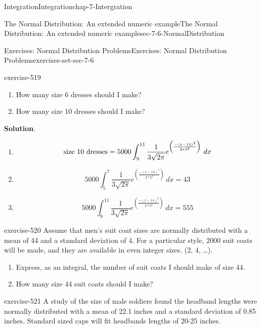 \documentclass[oneside,10pt,]{book}
\numberwithin{equation}{section}
\begin{document}
\begin{chapterptx}{Integration}{}{Integration}{}{}{chap-7-Intergration}
\begin{sectionptx}{The Normal Distribution: An extended numeric example}{}{The Normal Distribution: An extended numeric example}{}{}{sec-7-6-NormalDistribution}
\begin{exercises-subsection-numberless}{Exercises: Normal Distribution Problems}{}{Exercises: Normal Distribution Problems}{}{}{exercises-set-sec-7-6}
\begin{divisionexercise}{3}{}{}{exercise-519}
\begin{enumerate}[label=(\alph*)]
\item\hypertarget{li-781}{}\hypertarget{p-2976}{}%
How many size 6 dresses should I make?%
\item\hypertarget{li-782}{}\hypertarget{p-2977}{}%
How many size 10 dresses should I make?%
\end{enumerate}
\par\smallskip%
\noindent\textbf{Solution}.\hypertarget{solution-263}{}\quad%
\leavevmode%
\begin{enumerate}[label=(\alph*)]
\item\hypertarget{li-783}{}%
\begin{equation*}
\hbox{size 10 dresses}=5000\int_{9}^{11}
\frac{1}{3\sqrt{2\pi}}e^{\left({\frac{-(x-14)^2}{2*3^2}}\right)}\ dx
\end{equation*}
%
\item\hypertarget{li-784}{}%
\begin{equation*}
5000\int_{5}^{7}\frac{1}{3\sqrt{2\pi}} e^{\left({\frac{-(x-14)^2}{2*3^2}}\right)}\ dx = 43
\end{equation*}
%
\item\hypertarget{li-785}{}%
\begin{equation*}
5000\int_{9}^{11}\frac{1}{3\sqrt{2\pi}} e^{\left({\frac{-(x-14)^2}{2*3^2}}\right)}\ dx = 555
\end{equation*}
%
\end{enumerate}
\end{divisionexercise}%
\begin{divisionexercise}{4}{}{}{exercise-520}%
\hypertarget{p-2978}{}%
Assume that men’s suit coat sizes are normally distributed with a mean of 44 and a standard deviation of 4.  For a particular style, 2000 suit coats will be made, and they are available in even integer sizes.  (2, 4, …).%
\leavevmode%
\begin{enumerate}[label=(\alph*)]
\item\hypertarget{li-786}{}\hypertarget{p-2979}{}%
Express, as an integral, the number of suit coats I should make of size 44.%
\item\hypertarget{li-787}{}\hypertarget{p-2980}{}%
How many size 44 suit coats should I make?%
\end{enumerate}
\end{divisionexercise}%
\begin{divisionexercise}{5}{}{}{exercise-521}%
\hypertarget{p-2981}{}%
A study of the size of male soldiers found the headband lengths were normally distributed with a mean of 22.1 inches and a standard deviation of 0.85 inches.  Standard sized caps will fit headbands lengths of 20-25 inches.%

\end{divisionexercise}
\end{exercises-subsection-numberless}
\end{sectionptx}
\end{chapterptx}
\end{document}
